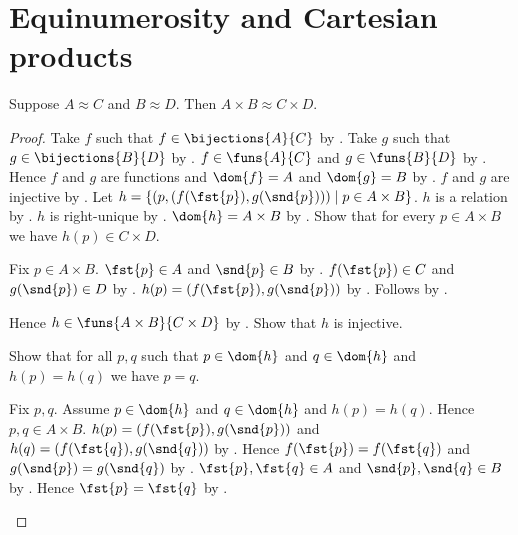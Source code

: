 

\section{Equinumerosity and Cartesian products}

\begin{theorem}\label{times_equinum_congruent}
    Suppose $A\approx C$ and $B\approx D$.
    Then $A\times B\approx C\times D$.
\end{theorem}
\begin{proof}
    Take $f$ such that $f\in\bijections{A}{C}$ by .
    Take $g$ such that $g\in\bijections{B}{D}$ by .
    $f\in\funs{A}{C}$ and $g\in\funs{B}{D}$
        by .
    Hence $f$ and $g$ are functions and $\dom{f}=A$ and $\dom{g}=B$
        by .
    $f$ and $g$ are injective by .
    Let $h=\{(p,(f(\fst{p}),g(\snd{p})))\mid p\in A\times B\}$.
    $h$ is a relation by .
    $h$ is right-unique by .
    $\dom{h}=A\times B$ by .
    Show that for every $p\in A\times B$ we have
        $h(p)\in C\times D$.
    \begin{subproof}
        Fix $p\in A\times B$.
        $\fst{p}\in A$ and $\snd{p}\in B$
            by .
        $f(\fst{p})\in C$ and $g(\snd{p})\in D$
            by .
        $h(p)=(f(\fst{p}),g(\snd{p}))$
            by .
        Follows by .
    \end{subproof}
    Hence $h\in\funs{A\times B}{C\times D}$ by .
    Show that $h$ is injective.
    \begin{subproof}
        Show that for all $p,q$ such that $p\in\dom{h}$ and
            $q\in\dom{h}$ and $h(p)=h(q)$ we have $p=q$.
        \begin{subproof}
            Fix $p,q$.
            Assume $p\in\dom{h}$ and $q\in\dom{h}$ and $h(p)=h(q)$.
            Hence $p,q\in A\times B$.
            $h(p)=(f(\fst{p}),g(\snd{p}))$ and
                $h(q)=(f(\fst{q}),g(\snd{q}))$
                by .
            Hence $f(\fst{p})=f(\fst{q})$ and
                $g(\snd{p})=g(\snd{q})$
                by .
            $\fst{p},\fst{q}\in A$ and $\snd{p},\snd{q}\in B$
                by .
            Hence $\fst{p}=\fst{q}$ by .

\end{subproof}
\end{subproof}
\end{proof}
